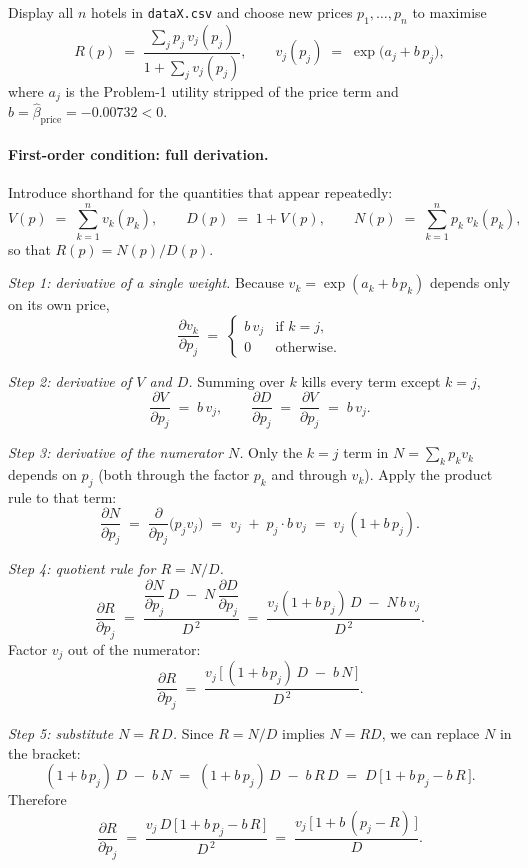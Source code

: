 \documentclass[11pt]{article}
\begin{document}
Display all $n$ hotels in \texttt{dataX.csv} and choose new prices
$p_1,\dots,p_n$ to maximise
\[
R(p) \;=\; \frac{\sum_j p_j\, v_j(p_j)}{1 + \sum_j v_j(p_j)},
\qquad
v_j(p_j) \;=\; \exp\!\big(a_j + b\, p_j\big),
\]
where $a_j$ is the Problem-1 utility stripped of the price term and
$b = \hat\beta_{\text{price}} = -0.00732 < 0$.

\paragraph{First-order condition: full derivation.}
Introduce shorthand for the quantities that appear repeatedly:
\[
V(p) \;=\; \sum_{k=1}^{n} v_k(p_k),
\qquad
D(p) \;=\; 1 + V(p),
\qquad
N(p) \;=\; \sum_{k=1}^{n} p_k\, v_k(p_k),
\]
so that $R(p) = N(p) / D(p)$.

\textit{Step 1: derivative of a single weight.}
Because $v_k = \exp(a_k + b\, p_k)$ depends only on its own price,
\[
\frac{\partial v_k}{\partial p_j}
  \;=\;
  \begin{cases}
    b\, v_j & \text{if } k = j, \\
    0 & \text{otherwise}.
  \end{cases}
\]

\textit{Step 2: derivative of $V$ and $D$.}
Summing over $k$ kills every term except $k=j$,
\[
\frac{\partial V}{\partial p_j} \;=\; b\, v_j,
\qquad
\frac{\partial D}{\partial p_j} \;=\; \frac{\partial V}{\partial p_j} \;=\; b\, v_j.
\]

\textit{Step 3: derivative of the numerator $N$.}
Only the $k=j$ term in $N = \sum_k p_k v_k$ depends on $p_j$ (both through
the factor $p_k$ and through $v_k$). Apply the product rule to that term:
\[
\frac{\partial N}{\partial p_j}
  \;=\;
  \frac{\partial}{\partial p_j}\big(p_j v_j\big)
  \;=\;
  v_j \;+\; p_j \cdot b\, v_j
  \;=\;
  v_j\,(1 + b\, p_j).
\]

\textit{Step 4: quotient rule for $R = N/D$.}
\[
\frac{\partial R}{\partial p_j}
  \;=\;
  \frac{\dfrac{\partial N}{\partial p_j}\, D \;-\; N\, \dfrac{\partial D}{\partial p_j}}{D^{\,2}}
  \;=\;
  \frac{v_j(1+b\,p_j)\, D \;-\; N\, b\, v_j}{D^{\,2}}.
\]
Factor $v_j$ out of the numerator:
\[
\frac{\partial R}{\partial p_j}
  \;=\;
  \frac{v_j\,\big[\, (1 + b\, p_j)\, D \;-\; b\, N \,\big]}{D^{\,2}}.
\]

\textit{Step 5: substitute $N = R\, D$.}
Since $R = N/D$ implies $N = R D$, we can replace $N$ in the bracket:
\[
(1 + b\, p_j)\, D \;-\; b\, N
  \;=\;
  (1 + b\, p_j)\, D \;-\; b\, R\, D
  \;=\;
  D\,\big[\, 1 + b\, p_j - b\, R \,\big].
\]
Therefore
\[
\frac{\partial R}{\partial p_j}
  \;=\;
  \frac{v_j\, D \,\big[\, 1 + b\, p_j - b\, R \,\big]}{D^{\,2}}
  \;=\;
  \frac{v_j\,\big[\, 1 + b\, (p_j - R) \,\big]}{D}.
\]
\end{document}
